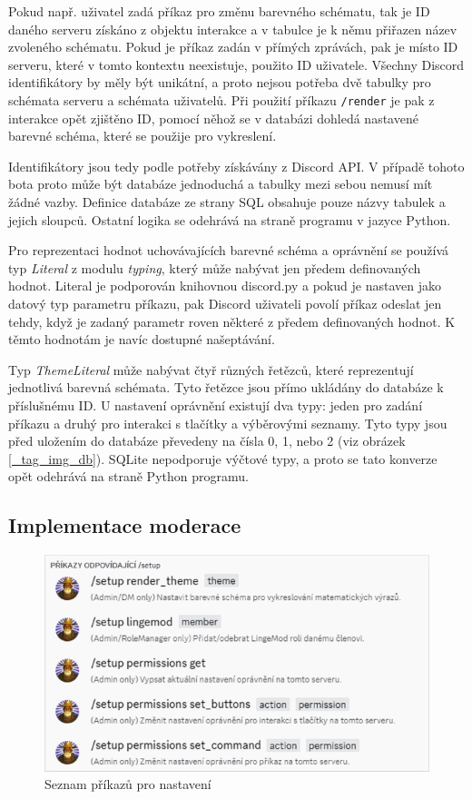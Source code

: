\documentclass[FM]{tulthesis}
\begin{document}
	Pokud např. uživatel zadá příkaz pro změnu barevného schématu, tak je ID daného serveru získáno z objektu interakce a v tabulce je k němu přiřazen název zvoleného schématu. Pokud je příkaz zadán v přímých zprávách, pak je místo ID serveru, které v tomto kontextu neexistuje, použito ID uživatele. Všechny Discord identifikátory by měly být unikátní, a proto nejsou potřeba dvě tabulky pro schémata serveru a schémata uživatelů. Při použití příkazu \verb|/render| je pak z interakce opět zjištěno ID, pomocí něhož se v databázi dohledá nastavené barevné schéma, které se použije pro vykreslení.
	
	Identifikátory jsou tedy podle potřeby získávány z Discord API. V případě tohoto bota proto může být databáze jednoduchá a tabulky mezi sebou nemusí mít žádné vazby. Definice databáze ze strany SQL obsahuje pouze názvy tabulek a jejich sloupců. Ostatní logika se odehrává na straně programu v jazyce Python.
	
	Pro reprezentaci hodnot uchovávajících barevné schéma a oprávnění se používá typ \textit{Literal} z modulu \textit{typing}, který může nabývat jen předem definovaných hodnot. Literal je podporován knihovnou discord.py a pokud je nastaven jako datový typ parametru příkazu, pak Discord uživateli povolí příkaz odeslat jen tehdy, když je zadaný parametr roven některé z předem definovaných hodnot. K těmto hodnotám je navíc dostupné našeptávání.
	
	Typ \textit{ThemeLiteral} může nabývat čtyř různých řetězců, které reprezentují jednotlivá barevná schémata. Tyto řetězce jsou přímo ukládány do databáze k příslušnému ID. U nastavení oprávnění existují dva typy: jeden pro zadání příkazu a druhý pro interakci s tlačítky a výběrovými seznamy. Tyto typy jsou před uložením do databáze převedeny na čísla 0, 1, nebo 2 (viz obrázek \ref{_tag_img_db}). SQLite nepodporuje výčtové typy, a proto se tato konverze opět odehrává na straně Python programu.
	
	\subsection{Implementace moderace}
	
	\begin{figure}[ht]
		\centering
		\includegraphics[width=\textwidth]{img/SetupCommands}
		\caption{Seznam příkazů pro nastavení}
	\end{figure}
	
\end{document}
